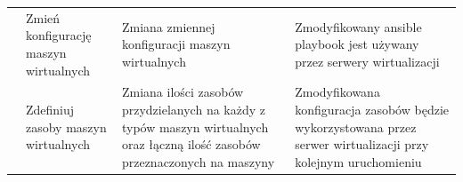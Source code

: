 \documentclass[12pt]{article}
\begin{document}
\begin{center}
\begin{table}[h!]
\begin{tabular}{|p{}|p{}|p{}|p{}|}
			                                                & Zmień konfigurację maszyn wirtualnych & Zmiana zmiennej konfiguracji maszyn wirtualnych                                                                              	& Zmodyfikowany ansible playbook jest używany przez serwery wirtualizacji                                                          \\ \cline{2-4}
			                                                & Zdefiniuj zasoby maszyn wirtualnych   & Zmiana ilości zasobów przydzielanych na każdy z typów maszyn wirtualnych oraz łączną ilość zasobów przeznaczonych na maszyny 	& Zmodyfikowana konfiguracja zasobów będzie wykorzystowana przez serwer wirtualizacji przy kolejnym uruchomieniu                   \\
			\hline
		\end{tabular}
	\end{table}
\end{center}

\newpage
\end{document}
